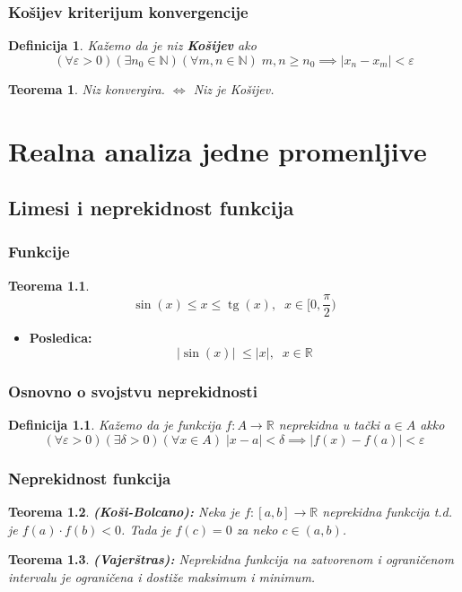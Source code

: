 \documentclass[a4paper,12pt,twoside]{report}
\newtheorem{theorem}{Teorema}[section]
\newtheorem{definition}{Definicija}[section]
\numberwithin{algorithm}{section}
\renewcommand{\tan}{\operatorname{tg}}
\begin{document}
\subsection{Košijev kriterijum konvergencije}
\begin{definition}
    Kažemo da je niz \textbf{Košijev} ako 
    \[ (\forall \varepsilon > 0)(\exists n_0 \in \mathbb{N})(\forall m, n \in \mathbb{N})\; m, n \geq n_0 \implies |x_n - x_m| < \varepsilon \]
\end{definition}
\begin{theorem}
    Niz konvergira. $\iff$ Niz je Košijev.
\end{theorem}

\chapter{Realna analiza jedne promenljive}
\section{Limesi i neprekidnost funkcija}
\subsection{Funkcije}
\begin{theorem}
    \[ \sin(x) \leq x \leq \tan(x),\;\; x \in \bigg[0, \frac{\pi}{2}\bigg) \]
\end{theorem}
\begin{itemize}
    \item \textbf{Posledica:} \[ |\sin(x)| \;\leq |x|,\;\; x \in \mathbb{R} \]
\end{itemize}

\subsection{Osnovno o svojstvu neprekidnosti}
\begin{definition}
    Kažemo da je funkcija $f : A \rightarrow \mathbb{R}$ neprekidna u tački $a \in A$ akko
    \[ (\forall \varepsilon > 0)(\exists \delta > 0)(\forall x \in A)\; |x-a| < \delta \implies |f(x) - f(a)| < \varepsilon \]
\end{definition}

\subsection{Neprekidnost funkcija}
\begin{theorem}
    \textbf{(Koši-Bolcano):} Neka je $f: [a, b] \rightarrow \mathbb{R}$ neprekidna funkcija t.d. je $f(a) \cdot f(b) < 0$. Tada je  $f(c) = 0$ za neko $c \in (a, b)$.
\end{theorem}
\begin{theorem}
    \textbf{(Vajerštras): } Neprekidna funkcija na zatvorenom i ograničenom intervalu je ograničena i dostiže maksimum i minimum.
\end{theorem}
\end{document}
